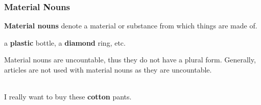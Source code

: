 \documentclass[10pt,a4paper]{article}
\begin{document}
\newpage
\subsubsection{Material Nouns}
\textbf{Material nouns} denote a material or substance from which things are made of.
\begin{center}
		a \textbf{plastic} bottle, a \textbf{diamond} ring, etc.
\end{center}
Material nouns are uncountable, thus they do not have a plural form. Generally, articles are not used with material nouns as they are uncountable.
\begin{center}
		\\
		I really want to buy these \textbf{cotton} pants.
\end{center}
\end{document}
